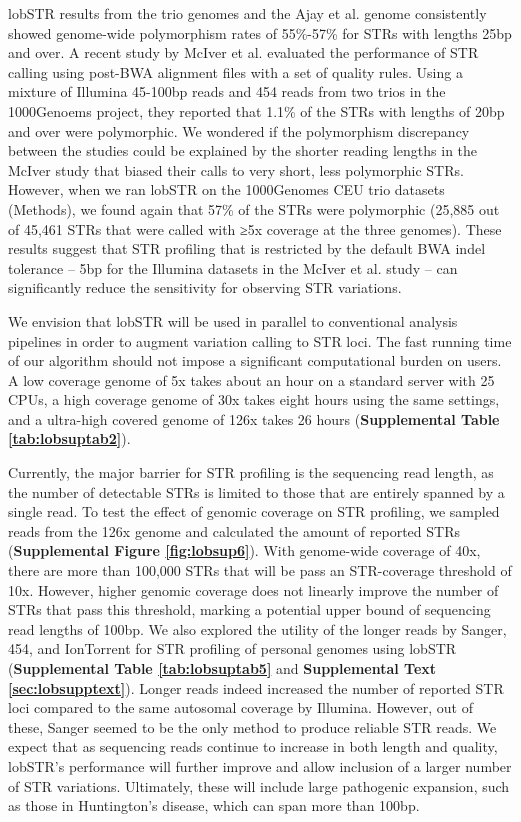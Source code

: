 lobSTR results from the trio genomes and the Ajay et al. genome consistently showed genome-wide polymorphism rates of 55\%-57\% for STRs with lengths 25bp and over. A recent study by McIver et al. \cite{McIverFondonSkinnerEtAl2011} evaluated the performance of STR calling using post-BWA alignment files with a set of quality rules. Using a mixture of Illumina 45-100bp reads and 454 reads from two trios in the 1000Genoems project, they reported that 1.1\% of the STRs with lengths of 20bp and over were polymorphic. We wondered if the polymorphism discrepancy between the studies could be explained by the shorter reading lengths in the McIver study that biased their calls to very short, less polymorphic STRs. However, when we ran lobSTR on the 1000Genomes CEU trio datasets (Methods), we found again that 57\% of the STRs were polymorphic (25,885 out of 45,461 STRs that were called with ≥5x coverage at the three genomes). These results suggest that STR profiling that is restricted by the default BWA indel tolerance -- 5bp for the Illumina datasets in the McIver et al. study -- can significantly reduce the sensitivity for observing STR variations. 

We envision that lobSTR will be used in parallel to conventional analysis pipelines in order to augment variation calling to STR loci. The fast running time of our algorithm should not impose a significant computational burden on users. A low coverage genome of 5x takes about an hour on a standard server with 25 CPUs, a high coverage genome of 30x takes eight hours using the same settings, and a ultra-high covered genome of 126x takes 26 hours (\textbf{Supplemental Table \ref{tab:lobsuptab2}}).

Currently, the major barrier for STR profiling is the sequencing read length, as the number of detectable STRs is limited to those that are entirely spanned by a single read. To test the effect of genomic coverage on STR profiling, we sampled reads from the 126x genome and calculated the amount of reported STRs (\textbf{Supplemental Figure \ref{fig:lobsup6}}). With genome-wide coverage of 40x, there are more than 100,000 STRs that will be pass an STR-coverage threshold of 10x. However, higher genomic coverage does not linearly improve the number of STRs that pass this threshold, marking a potential upper bound of sequencing read lengths of 100bp. We also explored the utility of the longer reads by Sanger, 454, and IonTorrent for STR profiling of personal genomes using lobSTR (\textbf{Supplemental Table \ref{tab:lobsuptab5}} and \textbf{Supplemental Text \ref{sec:lobsupptext}}). Longer reads indeed increased the number of reported STR loci compared to the same autosomal coverage by Illumina. However, out of these, Sanger seemed to be the only method to produce reliable STR reads. We expect that as sequencing reads continue to increase in both length and quality, lobSTR's performance will further improve and allow inclusion of a larger number of STR variations. Ultimately, these will include large pathogenic expansion, such as those in Huntington's disease, which can span more than 100bp. 

